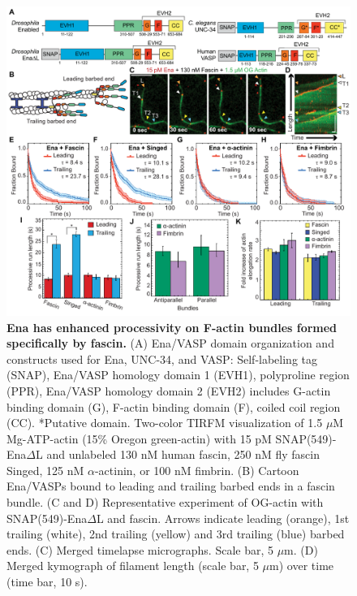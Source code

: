 \begin{figure}
\centering
\includegraphics[width=\textwidth]{img/ch02/Figure_1_elife.pdf}
\caption[Ena has enhanced processivity on F-actin bundles formed specifically by fascin.]{\textbf{Ena has enhanced processivity on F-actin bundles formed specifically by fascin.} (A) Ena/VASP domain organization and constructs used for Ena, UNC-34, and VASP: Self-labeling tag (SNAP), Ena/VASP homology domain 1 (EVH1), polyproline region (PPR), Ena/VASP homology domain 2 (EVH2) includes G-actin binding domain (G), F-actin binding domain (F), coiled coil region (CC). *Putative domain. Two-color TIRFM visualization of 1.5 $\mu$M Mg-ATP-actin (15\% Oregon green-actin) with 15 pM SNAP(549)-Ena$\Delta$L and unlabeled 130 nM human fascin, 250 nM fly fascin Singed, 125 nM $\alpha$-actinin, or 100 nM fimbrin.  (B) Cartoon Ena/VASPs bound to leading and trailing barbed ends in a fascin bundle. (C and D) Representative experiment of OG-actin with SNAP(549)-Ena$\Delta$L and fascin. Arrows indicate leading (orange), 1st trailing (white), 2nd trailing (yellow) and 3rd trailing (blue) barbed ends. (C) Merged timelapse micrographs. Scale bar, 5 $\mu$m. (D) Merged kymograph of filament length (scale bar, 5 $\mu$m) over time (time bar, 10 s).}
\label{fig:ena-bundlers}
\end{figure}

